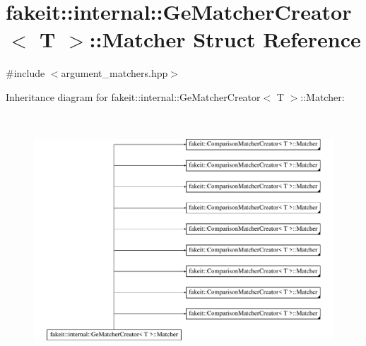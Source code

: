 \hypertarget{structfakeit_1_1internal_1_1GeMatcherCreator_1_1Matcher}{}\section{fakeit\+::internal\+::Ge\+Matcher\+Creator$<$ T $>$\+::Matcher Struct Reference}
\label{structfakeit_1_1internal_1_1GeMatcherCreator_1_1Matcher}


{\ttfamily \#include $<$argument\+\_\+matchers.\+hpp$>$}

Inheritance diagram for fakeit\+::internal\+::Ge\+Matcher\+Creator$<$ T $>$\+::Matcher\+:\begin{figure}[H]
\begin{center}
\leavevmode
\includegraphics[height=9.427609cm]{structfakeit_1_1internal_1_1GeMatcherCreator_1_1Matcher}
\end{center}
\end{figure}
